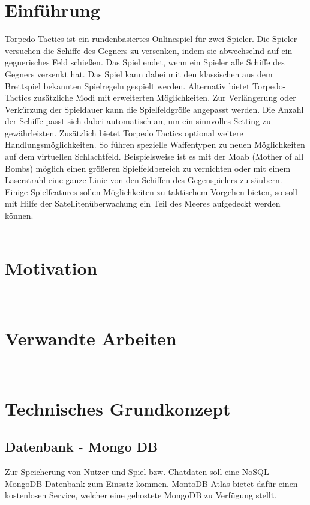 \documentclass[conference]{IEEEtran}
\begin{document}
	\section{Einführung}
    Torpedo-Tactics ist ein rundenbasiertes Onlinespiel für zwei Spieler. Die Spieler versuchen die Schiffe des Gegners zu versenken, indem sie abwechselnd auf ein gegnerisches Feld schießen. Das Spiel endet, wenn ein Spieler alle Schiffe des Gegners versenkt hat.
    Das Spiel kann dabei mit den klassischen aus dem Brettspiel bekannten Spielregeln gespielt werden. Alternativ bietet Torpedo-Tactics zusätzliche Modi mit erweiterten Möglichkeiten. Zur Verlängerung oder Verkürzung der Spieldauer kann die Spielfeldgröße angepasst werden.
    Die Anzahl der Schiffe passt sich dabei automatisch an, um ein sinnvolles Setting zu gewährleisten. Zusätzlich bietet Torpedo Tactics optional weitere Handlungsmöglichkeiten. So führen spezielle Waffentypen zu neuen Möglichkeiten auf dem virtuellen Schlachtfeld. 
    Beispielsweise ist es mit der Moab (Mother of all Bombs) möglich einen größeren Spielfeldbereich zu vernichten oder mit einem Laserstrahl eine ganze Linie von den Schiffen des Gegenspielers zu säubern. Einige Spielfeatures sollen Möglichkeiten zu taktischem Vorgehen bieten, so soll mit Hilfe der Satellitenüberwachung ein Teil des Meeres aufgedeckt werden können. \\
	\ \\
    \section{Motivation}
	
	\ \\
	\section{Verwandte Arbeiten}
	
    \ \\
	\section{Technisches Grundkonzept}
	\subsection{Datenbank - Mongo DB}
	Zur Speicherung von Nutzer und Spiel bzw. Chatdaten soll eine NoSQL MongoDB Datenbank zum Einsatz kommen. MontoDB Atlas bietet dafür einen kostenlosen Service, welcher eine gehostete MongoDB zu Verfügung stellt.
    \ \\
\end{document}
